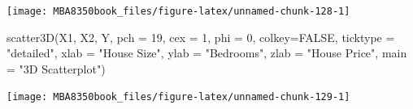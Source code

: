 \documentclass[
]{book}
\newenvironment{Shaded}{\begin{snugshade}}{\end{snugshade}}
\newcommand{\AttributeTok}[1]{\textcolor[rgb]{0.77,0.63,0.00}{#1}}
\newcommand{\ConstantTok}[1]{\textcolor[rgb]{0.00,0.00,0.00}{#1}}
\newcommand{\DecValTok}[1]{\textcolor[rgb]{0.00,0.00,0.81}{#1}}
\newcommand{\FunctionTok}[1]{\textcolor[rgb]{0.00,0.00,0.00}{#1}}
\newcommand{\NormalTok}[1]{#1}
\newcommand{\OtherTok}[1]{\textcolor[rgb]{0.56,0.35,0.01}{#1}}
\newcommand{\SpecialCharTok}[1]{\textcolor[rgb]{0.00,0.00,0.00}{#1}}
\newcommand{\StringTok}[1]{\textcolor[rgb]{0.31,0.60,0.02}{#1}}
\begin{document}
\begin{Shaded}
\end{Shaded}

\begin{center}\texttt{[image: MBA8350book\_files/figure-latex/unnamed-chunk-128-1]} \end{center}

\begin{Shaded}
\begin{Highlighting}[]
\FunctionTok{scatter3D}\NormalTok{(X1, X2, Y, }\AttributeTok{pch =} \DecValTok{19}\NormalTok{, }\AttributeTok{cex =} \DecValTok{1}\NormalTok{, }\AttributeTok{phi =} \DecValTok{0}\NormalTok{,}
          \AttributeTok{colkey=}\ConstantTok{FALSE}\NormalTok{, }\AttributeTok{ticktype =} \StringTok{"detailed"}\NormalTok{,}
          \AttributeTok{xlab =} \StringTok{"House Size"}\NormalTok{, }\AttributeTok{ylab =} \StringTok{"Bedrooms"}\NormalTok{,}
          \AttributeTok{zlab =} \StringTok{"House Price"}\NormalTok{, }\AttributeTok{main =} \StringTok{"3D Scatterplot"}\NormalTok{)}
\end{Highlighting}
\end{Shaded}

\begin{center}\texttt{[image: MBA8350book\_files/figure-latex/unnamed-chunk-129-1]} \end{center}
\end{document}
